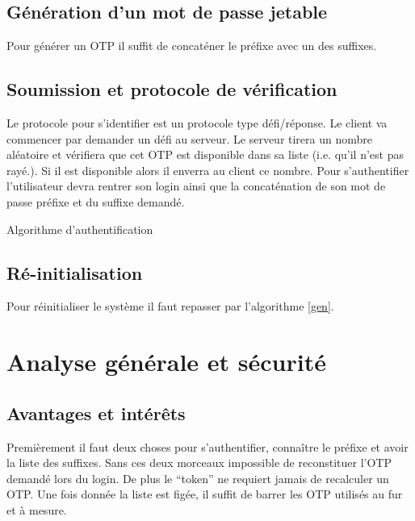 \documentclass{../res/univ-projet}
\begin{document}
\subsection{Génération d'un mot de passe jetable}
    Pour générer un OTP il suffit de concaténer le préfixe avec un des suffixes.

\subsection{Soumission et protocole de vérification}
        Le protocole pour s'identifier est un protocole type défi/réponse. Le client
    va commencer par demander un défi au serveur. Le serveur tirera un nombre aléatoire
    et vérifiera que cet OTP est disponible dans sa liste (i.e. qu'il n'est pas rayé.).
    Si il est disponible alors il enverra au client ce nombre. Pour s'authentifier l'utilisateur
    devra rentrer son login ainsi que la concaténation de son mot de passe préfixe et du suffixe
    demandé.

    \begin{algorithm}
        \begin{algorithmic}
            \ELSE
            \ENDIF
        \end{algorithmic}
        \caption{Algorithme d'authentification}
    \end{algorithm}


\subsection{Ré-initialisation}
        Pour réinitialiser le système il faut repasser par l'algorithme \ref{gen}.

\section{Analyse générale et sécurité}
\subsection{Avantages et intérêts}
        Premièrement il faut deux choses pour s'authentifier, connaître le préfixe et avoir
    la liste des suffixes. Sans ces deux morceaux impossible de reconstituer l'OTP
    demandé lors du login. De plus le ``token'' ne requiert jamais de recalculer un
    OTP. Une fois donnée la liste est figée, il suffit de barrer les OTP utilisés au
    fur et à mesure.
\end{document}
